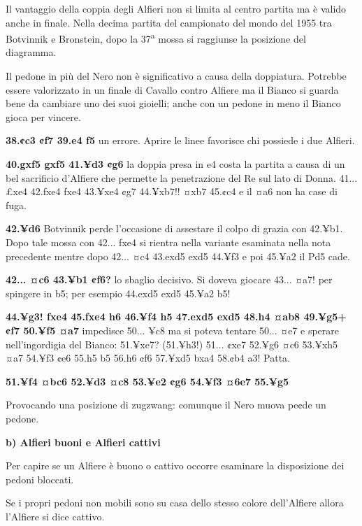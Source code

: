 
Il vantaggio della coppia degli Alfieri non si limita al centro partita
ma è valido anche in finale. Nella decima partita del campionato del
mondo del 1955 tra Botvinnik e Bronstein, dopo la 37\textsuperscript{a}
mossa si raggiunse la posizione del diagramma.

Il pedone in più del Nero non è significativo a causa della doppiatura.
Potrebbe essere valorizzato in un finale di Cavallo contro Alfiere ma il
Bianco si guarda bene da cambiare uno dei suoi gioielli; anche con un
pedone in meno il Bianco gioca per vincere.

\textbf{38.¢c3 ¢f7 39.e4 f5} un errore. Aprire le linee favorisce chi
possiede i due Alfieri.

\textbf{40.gxf5 gxf5 41.¥d3 ¢g6} la doppia presa in e4 costa la partita
a causa di un bel sacrificio d'Alfiere che permette la penetrazione del
Re sul lato di Donna. 41... £xe4 42.fxe4 fxe4 43.¥xe4 ¢g7 44.¥xb7!! ¤xb7
45.¢c4 e il ¤a6 non ha case di fuga.

\textbf{42.¥d6} Botvinnik perde l'occasione di assestare il colpo di
grazia con 42.¥b1. Dopo tale mossa con 42... fxe4 si rientra nella
variante esaminata nella nota precedente mentre dopo 42... ¤c4 43.exd5
exd5 44.¥f3 e poi 45.¥a2 il Pd5 cade.

\textbf{42... ¤c6 43.¥b1 ¢f6?} lo sbaglio decisivo. Si doveva giocare
43... ¤a7! per spingere in b5; per esempio 44.exd5 exd5 45.¥a2 b5!

\textbf{44.¥g3! fxe4 45.fxe4 h6 46.¥f4 h5 47.exd5 exd5 48.h4 ¤ab8
49.¥g5+ ¢f7 50.¥f5 ¤a7} impedisce 50... ¥c8 ma si poteva tentare 50...
¤e7 e sperare nell'ingordigia del Bianco: 51.¥xe7? (51.¥h3!) 51... ¢xe7
52.¥g6 ¤c6 53.¥xh5 ¤a7 54.¥f3 ¢e6 55.h5 b5 56.h6 ¢f6 57.¥xd5 bxa4 58.¢b4
a3! Patta.

\textbf{51.¥f4 ¤bc6 52.¥d3 ¤c8 53.¥e2 ¢g6 54.¥f3 ¤6e7 55.¥g5}


Provocando una posizione di zugzwang: comunque il Nero muova pe¢de un
pedone.

\textbf{b) Alfieri buoni e Alfieri cattivi}

Per capire se un Alfiere è buono o cattivo occorre esaminare la
disposizione dei pedoni bloccati.

Se i propri pedoni non mobili sono su casa dello stesso colore
dell'Alfiere allora l'Alfiere si dice cattivo.

